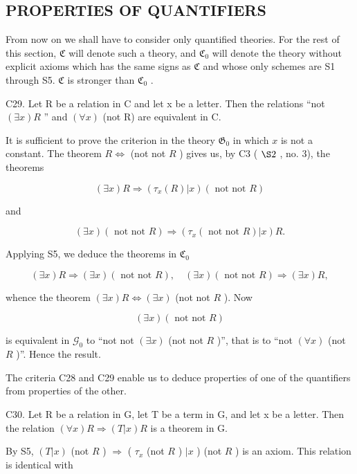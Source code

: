 \subsection{PROPERTIES OF QUANTIFIERS}

From now on we shall have to consider only quantified theories. For the rest of this section, \(\mathfrak{C}\) will denote such a theory, and \(\mathfrak{C}_0\) will denote the theory without explicit axioms which has the same signs as \(\mathfrak{C}\) and whose only schemes are S1 through S5. \(\mathfrak{C}\) is stronger than \(\mathfrak{C}_0\) .

C29. Let R be a relation in C and let x be a letter. Then the relations ``not \((\exists x)R\) '' and \((\forall x)\) (not R) are equivalent in C.

It is sufficient to prove the criterion in the theory \(\mathfrak{G}_0\) in which \(x\) is not a constant. The theorem \(R \Longleftrightarrow\) (not not \(R\) ) gives us, by C3 ( \(\S 2\) , no. 3), the theorems

\[
(\exists x) R \Longrightarrow (\tau_ {x} (R) | x) (\text { not   not } R)
\]

and

\[
(\exists x) (\text { not   not } R) \Longrightarrow (\tau_ {x} (\text { not   not } R) | x) R.
\]

Applying S5, we deduce the theorems in \(\mathfrak{C}_{0}\)

\[
(\exists x) R \Longrightarrow (\exists x) (\text { not   not } R), \quad (\exists x) (\text { not   not } R) \Longrightarrow (\exists x) R,
\]

whence the theorem \((\exists x)R \Longleftrightarrow (\exists x)\) (not not \(R\) ). Now

\[
(\exists x) (\text { not   not } R)
\]

is equivalent in \(\mathcal{G}_0\) to ``not not \((\exists x)\) (not not \(R\) )'', that is to ``not \((\forall x)\) (not \(R\) )''. Hence the result.

The criteria C28 and C29 enable us to deduce properties of one of the quantifiers from properties of the other.

C30. Let R be a relation in G, let T be a term in G, and let x be a letter. Then the relation \((\forall x)R \Longrightarrow (T|x)R\) is a theorem in G.

By S5, \((T|x)\) (not \(R\) ) \(\Longrightarrow\) ( \(\tau_{x}\) (not \(R\) ) \(|x\) ) (not \(R\) ) is an axiom. This relation is identical with

